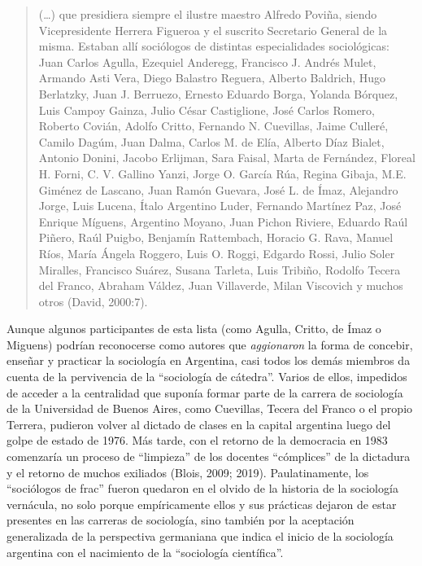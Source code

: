 \begin{quote}
(\dots) que presidiera siempre el ilustre maestro Alfredo Poviña, siendo Vicepresidente Herrera Figueroa y el suscrito Secretario General de la misma. Estaban allí sociólogos de distintas especialidades sociológicas: Juan Carlos Agulla, Ezequiel Anderegg, Francisco J. Andrés Mulet, Armando Asti Vera, Diego Balastro Reguera, Alberto Baldrich, Hugo Berlatzky, Juan J. Berruezo, Ernesto Eduardo Borga, Yolanda Bórquez, Luis Campoy Gainza, Julio César Castiglione, José Carlos Romero, Roberto Covián, Adolfo Critto, Fernando N. Cuevillas, Jaime Culleré, Camilo Dagúm, Juan Dalma, Carlos M. de Elía, Alberto Díaz Bialet, Antonio Donini, Jacobo Erlijman, Sara Faisal, Marta de Fernández, Floreal H. Forni, C. V. Gallino Yanzi, Jorge O. García Rúa, Regina Gibaja, M.E. Giménez de Lascano, Juan Ramón Guevara, José L. de Ímaz, Alejandro Jorge, Luis Lucena, Ítalo Argentino Luder, Fernando Martínez Paz, José Enrique Míguens, Argentino Moyano, Juan Pichon Riviere, Eduardo Raúl Piñero, Raúl Puigbo, Benjamín Rattembach, Horacio G. Rava, Manuel Ríos, María Ángela Roggero, Luis O. Roggi, Edgardo Rossi, Julio Soler Miralles, Francisco Suárez, Susana Tarleta, Luis Tribiño, Rodolfo Tecera del Franco, Abraham Váldez, Juan Villaverde, Milan Viscovich y muchos otros (David, 2000:7).
\end{quote}

Aunque algunos participantes de esta lista (como Agulla, Critto, de Ímaz o Miguens) podrían reconocerse como autores que \emph{aggionaron} la forma de concebir, enseñar y practicar la sociología en Argentina, casi todos los demás miembros da cuenta de la pervivencia de la ``sociología de cátedra''. Varios de ellos, impedidos de acceder a la centralidad que suponía formar parte de la carrera de sociología de la Universidad de Buenos Aires, como Cuevillas, Tecera del Franco o el propio Terrera, pudieron volver al dictado de clases en la capital argentina luego del golpe de estado de 1976. Más tarde, con el retorno de la democracia en 1983 comenzaría un proceso de ``limpieza'' de los docentes ``cómplices'' de la dictadura y el retorno de muchos exiliados (Blois, 2009; 2019). Paulatinamente, los ``sociólogos de frac'' fueron quedaron en el olvido de la historia de la sociología vernácula, no solo porque empíricamente ellos y sus prácticas dejaron de estar presentes en las carreras de sociología, sino también por la aceptación generalizada de la perspectiva germaniana que indica el inicio de la sociología argentina con el nacimiento de la ``sociología científica''.

